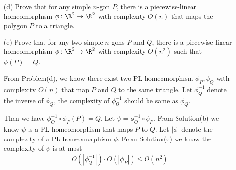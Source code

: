 \documentclass[11pt]{article}
\begin{document}
\begin{enumerate}[(a)]
  \item[(d)]
    Prove that for any simple \(n\)-gon \(P\), there is a piecewise-linear homeomorphism \(\phi :
    \R^2 \to \R^2\) with complexity \(O(n)\) that maps the polygon \(P\) to a triangle.

\begin{solution}
\end{solution}

  \item[(e)]
    Prove that for any two simple \(n\)-gons \(P\) and \(Q\), there is a piecewise-linear
    homeomorphism \(\phi : \R^2 \to \R^2\) with complexity \(O(n^2)\) such that \(\phi(P) = Q\).

\begin{solution}
  From Problem(d), we know there exist two PL homeomorphism \(\phi_P,\phi_Q\) with complexity \(O(n)\) that map \(P\) and \(Q\) to the same triangle.
  Let \(\phi^{-1}_Q\) denote the inverse of \(\phi_Q\), the complexity of \(\phi^{-1}_Q\) should be same as \(\phi_Q\).

  Then we have \(\phi^{-1}_Q\circ\phi_P(P)=Q\).
  Let \(\psi=\phi^{-1}_Q\circ \phi_P\).
  From Solution(b) we know \(\psi\) is a PL homeomorphism that maps \(P\) to \(Q\).
  Let \(|\phi|\) denote the complexity of a PL homeomorphism \(\phi\).
  From Solution(c) we know the complexity of \(\psi\) is at most
  \[O(|\phi^{-1}_Q|)\cdot O(|\phi_P|)\le O(n^2)\]


\end{solution}
\end{enumerate}
\end{document}
